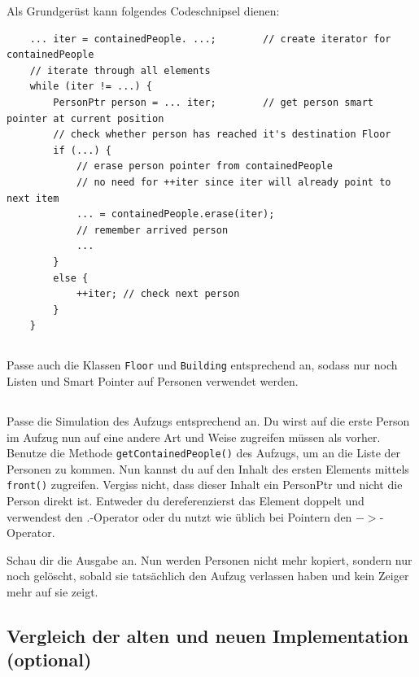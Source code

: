 
Als Grundgerüst kann folgendes Codeschnipsel dienen:

\begin{lstlisting}
	... iter = containedPeople. ...;		// create iterator for containedPeople
	// iterate through all elements
	while (iter != ...) {
		PersonPtr person = ... iter; 		// get person smart pointer at current position
		// check whether person has reached it's destination Floor
		if (...) {
			// erase person pointer from containedPeople
			// no need for ++iter since iter will already point to next item
			... = containedPeople.erase(iter);
			// remember arrived person
			...
		}
		else {
			++iter; // check next person
		}
	}
\end{lstlisting}

\subsection{}
Passe auch die Klassen \texttt{Floor} und \texttt{Building} entsprechend an, sodass nur noch Listen und Smart Pointer auf Personen verwendet werden.

\subsection{}
Passe die Simulation des Aufzugs entsprechend an.
Du wirst auf die erste Person im Aufzug nun auf eine andere Art und Weise zugreifen müssen als vorher.
Benutze die Methode \texttt{getContainedPeople()} des Aufzugs, um an die Liste der Personen zu kommen.
Nun kannst du auf den Inhalt des ersten Elements mittels \texttt{front()} zugreifen.
Vergiss nicht, dass dieser Inhalt ein PersonPtr und nicht die Person direkt ist.
Entweder du dereferenzierst das Element doppelt und verwendest den $.$-Operator oder du nutzt wie üblich bei Pointern den $->$-Operator.

Schau dir die Ausgabe an.
Nun werden Personen nicht mehr kopiert, sondern nur noch gelöscht, sobald sie tatsächlich den Aufzug verlassen haben und kein Zeiger mehr auf sie zeigt.

\subsection{Vergleich der alten und neuen Implementation (optional)}

